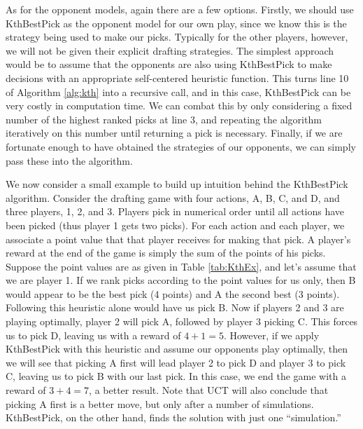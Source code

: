 \documentclass[letterpaper]{article}
\numberwithin{equation}{section}
\numberwithin{theorem}{section}
\numberwithin{lemma}{section}
\numberwithin{df}{section}
\begin{document}
As for the opponent models, again there are a few options.  Firstly, we should use KthBestPick as the opponent model for our own play, since we know this is the strategy being used to make our picks.  Typically for the other players, however, we will not be given their explicit drafting strategies.  The simplest approach would be to assume that the opponents are also using KthBestPick to make decisions with an appropriate self-centered heuristic function.  This turns line 10 of Algorithm \ref{alg:kth} into a recursive call, and in this case, KthBestPick can be very costly in computation time.  We can combat this by only considering a fixed number of the highest ranked picks at line 3, and repeating the algorithm iteratively on this number until returning a pick is necessary.  Finally, if we are fortunate enough to have obtained the strategies of our opponents, we can simply pass these into the algorithm.

We now consider a small example to build up intuition behind the KthBestPick algorithm.  Consider the drafting game with four actions, A, B, C, and D, and three players, 1, 2, and 3.  Players pick in numerical order until all actions have been picked (thus player 1 gets two picks).  For each action and each player, we associate a point value that that player receives for making that pick.  A player's reward at the end of the game is simply the sum of the points of his picks.  Suppose the point values are as given in Table \ref{tab:KthEx}, and let's assume that we are player 1.  If we rank picks according to the point values for us only, then B would appear to be the best pick (4 points) and A the second best (3 points).  Following this heuristic alone would have us pick B.  Now if players 2 and 3 are playing optimally, player 2 will pick A, followed by player 3 picking C.  This forces us to pick D, leaving us with a reward of $4 + 1 = 5$.  However, if we apply KthBestPick with this heuristic and assume our opponents play optimally, then we will see that picking A first will lead player 2 to pick D and player 3 to pick C, leaving us to pick B with our last pick.  In this case, we end the game with a reward of $3 + 4 = 7$, a better result.  Note that UCT will also conclude that picking A first is a better move, but only after a number of simulations.  KthBestPick, on the other hand, finds the solution with just one ``simulation.'' 
\end{document}
